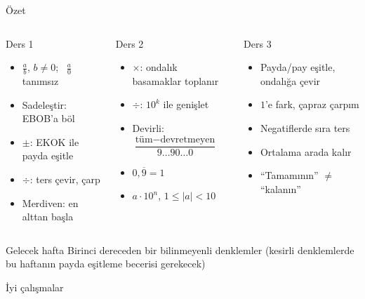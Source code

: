 \documentclass[aspectratio=169,11pt,handout]{beamer}
\newcommand{\ab}[1]{\overline{#1}}
\begin{document}
\begin{frame}{Özet}
\small
\begin{columns}[t]
\begin{block}{Ders 1}
\begin{itemize}
\item \(\frac{a}{b}\), \(b\neq 0\); \ \(\frac{a}{0}\) tanımsız
\item Sadeleştir: EBOB'a böl
\item \(\pm\): EKOK ile payda eşitle
\item \(\div\): ters çevir, çarp
\item Merdiven: en alttan başla
\end{itemize}
\end{block}
\begin{block}{Ders 2}
\begin{itemize}
\item \(\times\): ondalık basamaklar toplanır
\item \(\div\): \(10^{k}\) ile genişlet
\item Devirli: \(\dfrac{\text{tüm}-\text{devretmeyen}}{9\ldots 90\ldots 0}\)
\item \(0{,}\ab{9}=1\)
\item \(a\cdot 10^{n}\), \(1\le|a|<10\)
\end{itemize}
\end{block}
\begin{block}{Ders 3}
\begin{itemize}
\item Payda/pay eşitle, ondalığa çevir
\item \(1\)'e fark, çapraz çarpım
\item Negatiflerde sıra ters
\item Ortalama arada kalır
\item ``Tamamının'' \(\neq\) ``kalanın''
\end{itemize}
\end{block}
\end{columns}
\vspace{2pt}
\begin{alertblock}{Gelecek hafta}
Birinci dereceden bir bilinmeyenli denklemler (kesirli denklemlerde bu haftanın payda eşitleme becerisi gerekecek)
\end{alertblock}
\end{frame}

\begin{frame}
\centering\Large İyi çalışmalar
\end{frame}
\end{document}
